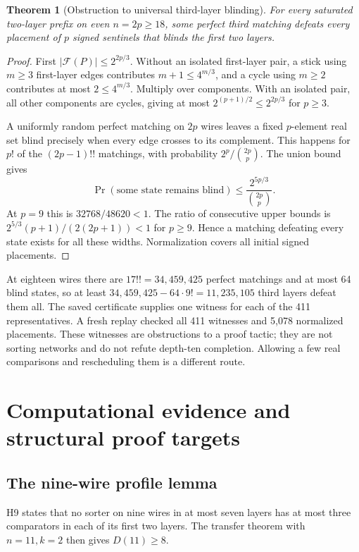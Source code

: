 \documentclass[11pt]{article}
\newtheorem{theorem}{Theorem}[section]
\newcommand{\F}{\mathcal F}
\begin{document}
\begin{theorem}[Obstruction to universal third-layer blinding]\label{thm:third}
For every saturated two-layer prefix on even $n=2p\ge18$, some perfect third matching defeats every placement of $p$ signed sentinels that blinds the first two layers.
\end{theorem}
\begin{proof}
First $|\F(P)|\le2^{2p/3}$. Without an isolated first-layer pair, a stick using $m\ge3$ first-layer edges contributes $m+1\le4^{m/3}$, and a cycle using $m\ge2$ contributes at most $2\le4^{m/3}$. Multiply over components. With an isolated pair, all other components are cycles, giving at most $2^{(p+1)/2}\le2^{2p/3}$ for $p\ge3$.

A uniformly random perfect matching on $2p$ wires leaves a fixed $p$-element real set blind precisely when every edge crosses to its complement. This happens for $p!$ of the $(2p-1)!!$ matchings, with probability $2^p/\binom{2p}{p}$. The union bound gives
\[
\Pr(\text{some state remains blind})\le
\frac{2^{5p/3}}{\binom{2p}{p}}.
\]
At $p=9$ this is $32768/48620<1$. The ratio of consecutive upper bounds is $2^{5/3}(p+1)/(2(2p+1))<1$ for $p\ge9$. Hence a matching defeating every state exists for all these widths. Normalization covers all initial signed placements.
\end{proof}

At eighteen wires there are $17!!=34,459,425$ perfect matchings and at most 64 blind states, so at least $34,459,425-64\cdot9!=11,235,105$ third layers defeat them all. The saved certificate supplies one witness for each of the 411 representatives. A fresh replay checked all 411 witnesses and 5,078 normalized placements. These witnesses are obstructions to a proof tactic; they are not sorting networks and do not refute depth-ten completion. Allowing a few real comparisons and rescheduling them is a different route.

\section{Computational evidence and structural proof targets}\label{sec:computations}
\subsection{The nine-wire profile lemma}\label{sec:h9}
H9 states that no sorter on nine wires in at most seven layers has at most three comparators in each of its first two layers. The transfer theorem with $n=11,k=2$ then gives $D(11)\ge8$.
\end{document}
